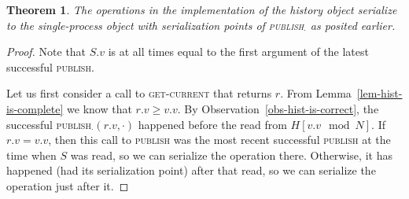 \documentclass[a4paper,11pt]{article}
\newtheorem{theorem}{Theorem}
\newcommand{\fn}[1]{\textsc{#1}}
\begin{document}
\begin{theorem}
The operations in the implementation of the history object serialize to the single-process object with serialization points of \fn{publish$_\cdot$} as posited earlier.
\end{theorem}
\begin{proof}
Note that $S.v$ is at all times equal to the first argument of the latest successful \fn{publish}.

Let us first consider a call to \fn{get-current} that returns $r$. From Lemma~\ref{lem-hist-is-complete} we know that $r.v \geq v.v$.
By Observation~\ref{obs-hist-is-correct}, the successful \fn{publish$_\cdot$}$(r.v, \cdot)$ happened before the read from $H[v.v\mod N]$. If $r.v = v.v$, then this call to \fn{publish} was the most recent successful \fn{publish} at the time when $S$ was read, so we can serialize the operation there. Otherwise, it has happened (had its serialization point) after that read, so we can serialize the operation just after it.


\end{proof}
\end{document}
